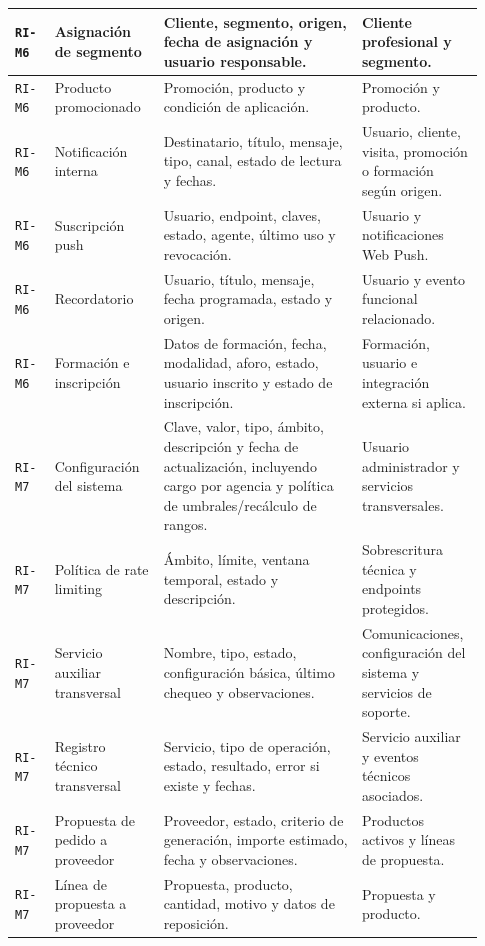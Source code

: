 {\begin{supertabular}{|>{\raggedright\arraybackslash}p{0.08\linewidth}|>{\raggedright\arraybackslash}p{0.22\linewidth}|>{\raggedright\arraybackslash}p{0.40\linewidth}|>{\raggedright\arraybackslash}p{0.23\linewidth}|}
\hline
\texttt{RI-M6} & Asignación de segmento & Cliente, segmento, origen, fecha de asignación y usuario responsable. & Cliente profesional y segmento. \\
\hline
\texttt{RI-M6} & Producto promocionado & Promoción, producto y condición de aplicación. & Promoción y producto. \\
\hline
\texttt{RI-M6} & Notificación interna & Destinatario, título, mensaje, tipo, canal, estado de lectura y fechas. & Usuario, cliente, visita, promoción o formación según origen. \\
\hline
\texttt{RI-M6} & Suscripción push & Usuario, endpoint, claves, estado, agente, último uso y revocación. & Usuario y notificaciones Web Push. \\
\hline
\texttt{RI-M6} & Recordatorio & Usuario, título, mensaje, fecha programada, estado y origen. & Usuario y evento funcional relacionado. \\
\hline
\texttt{RI-M6} & Formación e inscripción & Datos de formación, fecha, modalidad, aforo, estado, usuario inscrito y estado de inscripción. & Formación, usuario e integración externa si aplica. \\
\hline
{}
\texttt{RI-M7} & Configuración del sistema & Clave, valor, tipo, ámbito, descripción y fecha de actualización, incluyendo cargo por agencia y política de umbrales/recálculo de rangos. & Usuario administrador y servicios transversales. \\
\hline
\texttt{RI-M7} & Política de rate limiting & Ámbito, límite, ventana temporal, estado y descripción. & Sobrescritura técnica y endpoints protegidos. \\
\hline
\texttt{RI-M7} & Servicio auxiliar transversal & Nombre, tipo, estado, configuración básica, último chequeo y observaciones. & Comunicaciones, configuración del sistema y servicios de soporte. \\
\hline
\texttt{RI-M7} & Registro técnico transversal & Servicio, tipo de operación, estado, resultado, error si existe y fechas. & Servicio auxiliar y eventos técnicos asociados. \\
\hline
\texttt{RI-M7} & Propuesta de pedido a proveedor & Proveedor, estado, criterio de generación, importe estimado, fecha y observaciones. & Productos activos y líneas de propuesta. \\
\hline
\texttt{RI-M7} & Línea de propuesta a proveedor & Propuesta, producto, cantidad, motivo y datos de reposición. & Propuesta y producto. \\

\end{supertabular}}
